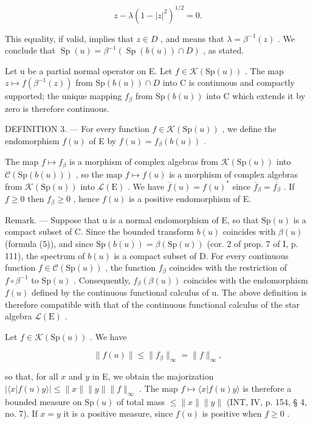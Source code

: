 \[
z - \lambda (1 - | z | ^ {2}) ^ {1 / 2} = 0.
\]

This equality, if valid, implies that \(z \in D\) , and means that \(\lambda = \beta^{-1}(z)\) . We conclude that \(\operatorname{Sp}(u) = \beta^{-1}(\operatorname{Sp}(b(u)) \cap D)\) , as stated.

Let u be a partial normal operator on E. Let \(f \in \mathcal{K}(\mathrm{Sp}(u))\) . The map \(z \mapsto f(\beta^{-1}(z))\) from \(\mathrm{Sp}(b(u)) \cap D\) into C is continuous and compactly supported; the unique mapping \(f_{\beta}\) from \(\mathrm{Sp}(b(u))\) into C which extends it by zero is therefore continuous.

DEFINITION 3. --- For every function \(f \in \mathcal{K}(\mathrm{Sp}(u))\) , we define the endomorphism \(f(u)\) of E by \(f(u) = f_{\beta}(b(u))\) .

The map \(f \mapsto f_{\beta}\) is a morphism of complex algebras from \(\mathcal{K}(\mathrm{Sp}(u))\) into \(\mathcal{C}(\mathrm{Sp}(b(u)))\) , so the map \(f \mapsto f(u)\) is a morphism of complex algebras from \(\mathcal{K}(\mathrm{Sp}(u))\) into \(\mathcal{L}(\mathrm{E})\) . We have \(\overline{f}(u) = f(u)^*\) since \(\overline{f}_{\beta} = \overline{f_{\beta}}\) . If \(f \geqslant 0\) then \(f_{\beta} \geqslant 0\) , hence \(f(u)\) is a positive endomorphism of E.

Remark. --- Suppose that u is a normal endomorphism of E, so that \(\mathrm{Sp}(u)\) is a compact subset of C. Since the bounded transform \(b(u)\) coincides with \(\beta(u)\) (formula (5)), and since \(\mathrm{Sp}(b(u)) = \beta(\mathrm{Sp}(u))\) (cor. 2 of prop. 7 of I, p. 111), the spectrum of \(b(u)\) is a compact subset of D. For every continuous function \(f \in \mathcal{C}(\mathrm{Sp}(u))\) , the function \(f_{\beta}\) coincides with the restriction of \(f \circ \beta^{-1}\) to \(\mathrm{Sp}(u)\) . Consequently, \(f_{\beta}(\beta(u))\) coincides with the endomorphism \(f(u)\) defined by the continuous functional calculus of u. The above definition is therefore compatible with that of the continuous functional calculus of the star algebra \(\mathcal{L}(\mathrm{E})\) .

Let \(f\in \mathcal{K}(\mathrm{Sp}(u))\) . We have

\[
\| f (u) \| \leqslant \| f _ {\beta} \| _ {\infty} = \| f \| _ {\infty},
\]

so that, for all \(x\) and \(y\) in E, we obtain the majorization \(|\langle x | f(u)y\rangle| \leqslant \|x\|\|y\|\|f\|_{\infty}\) . The map \(f \mapsto \langle x | f(u)y\rangle\) is therefore a bounded measure on \(\mathrm{Sp}(u)\) of total mass \(\leqslant \|x\|\|y\|\) (INT, IV, p. 154, § 4, no. 7). If \(x = y\) it is a positive measure, since \(f(u)\) is positive when \(f \geqslant 0\) .

